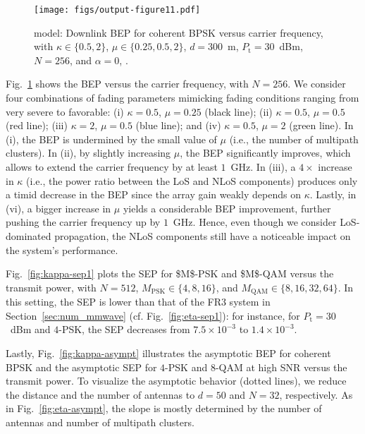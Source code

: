\documentclass[journal,twocolumn]{IEEEtran}
\begin{document}
\begin{figure}[t]
    \centering
    \texttt{[image: figs/output-figure11.pdf]}
    \caption{\km{} model: Downlink \ac{BEP} for coherent \ac{BPSK} versus carrier frequency, with $\kappa \in \{0.5, 2\}$, $\mu \in \{0.25, 0.5, 2\}$, $d = 300$~m, $P_{\textrm{t}} = 30$~dBm, $N = 256$, and $\alpha=0$, .}
    \label{fig:kappa-bep3}
\end{figure}

Fig.~\ref{fig:kappa-bep3} shows the \ac{BEP} versus the carrier frequency, with $N = 256$. We consider four combinations of fading parameters mimicking fading conditions ranging from very severe to favorable: (i) $\kappa=0.5$, $\mu=0.25$ (black line); (ii) $\kappa=0.5$, $\mu=0.5$ (red line); (iii) $\kappa=2$, $\mu=0.5$ (blue line); and (iv) $\kappa=0.5$, $\mu=2$ (green line). In (i), the \ac{BEP} is undermined by the small value of $\mu$ (i.e., the number of multipath clusters). In (ii), by slightly increasing $\mu$, the \ac{BEP} significantly improves, which allows to extend the carrier frequency by at least $1$~GHz. In (iii), a $4 \times$ increase in $\kappa$ (i.e., the power ratio between the \ac{LoS} and \ac{NLoS} components) produces only a timid decrease in the \ac{BEP} since the array gain weakly depends on $\kappa$. Lastly, in (vi), a bigger increase in $\mu$ yields a considerable \ac{BEP} improvement, further pushing the carrier frequency up by $1$~GHz. Hence, even though we consider \ac{LoS}-dominated propagation, the \ac{NLoS} components still have a noticeable impact on the system's performance.

Fig.~\ref{fig:kappa-sep1} plots the \ac{SEP} for \ac{$M$-PSK} and \ac{$M$-QAM} versus the transmit power, with $N=512$, $M_{\textrm{PSK}} \in \{4,8,16 \}$, and $M_{\textrm{QAM}} \in \{8,16,32,64\}$. In this setting, the \ac{SEP} is lower than that of the FR3 system in Section~\ref{sec:num_mmwave} (cf. Fig.~\ref{fig:eta-sep1}): for instance, for $P_{\textrm{t}} = 30$~dBm and $4$-PSK, the \ac{SEP} decreases from $7.5 \times 10^{-3}$ to $1.4 \times 10^{-3}$.


Lastly, Fig.~\ref{fig:kappa-asympt} illustrates the asymptotic \ac{BEP} for coherent \ac{BPSK} and the asymptotic \ac{SEP} for $4$-PSK and $8$-QAM at high SNR versus the transmit power. To visualize the asymptotic behavior (dotted lines), we reduce the distance and the number of antennas to $d=50$ and $N=32$, respectively. As in Fig.~\ref{fig:eta-asympt}, the slope is mostly determined by the number of antennas and number of multipath clusters.
\end{document}
